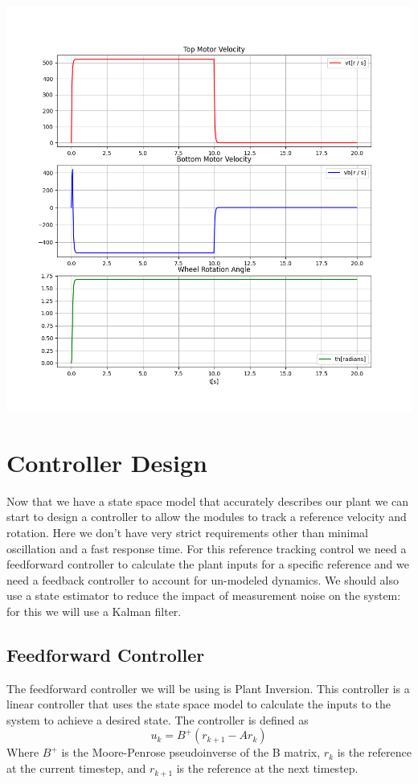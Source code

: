 \documentclass{scrartcl}
\begin{document}
\begin{minipage}{.45\textwidth}
    \centering
    \includegraphics[width=\textwidth]{forced_response.png}
    \label{fig:forced_response}
\end{minipage}

\newpage

\section{Controller Design}
Now that we have a state space model that accurately describes our plant we can start to design a controller to allow the modules to track a reference velocity and rotation.
Here we don't have very strict requirements other than minimal oscillation and a fast response time.
For this reference tracking control we need a feedforward controller to calculate the plant inputs for a specific reference and we need a feedback controller to account for un-modeled dynamics.
We should also use a state estimator to reduce the impact of measurement noise on the system: for this we will use a Kalman filter.

\subsection{Feedforward Controller}
The feedforward controller we will be using is Plant Inversion.
This controller is a linear controller that uses the state space model to calculate the inputs to the system to achieve a desired state.
The controller is defined as
\begin{equation}
    u_k = B^+(r_{k+1} - Ar_k)
\end{equation}
Where \(B^+\) is the Moore-Penrose pseudoinverse of the B matrix, \(r_k\) is the reference at the current timestep, and \(r_{k+1}\) is the reference at the next timestep.
\end{document}
